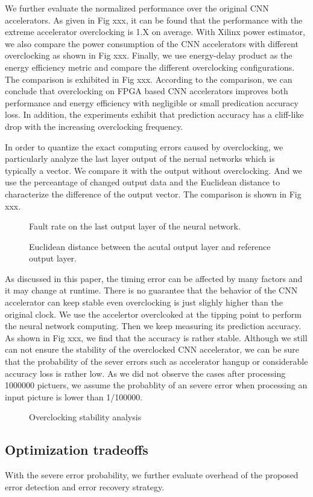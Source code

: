 We further evaluate the normalized performance over the original CNN accelerators.
As given in Fig xxx, it can be found that the performance with the extreme accelerator 
overclocking is 1.X on average. With Xilinx power estimator, we also compare the 
power consumption of the CNN accelerators with different overclocking as shown in Fig xxx.
Finally, we use energy-delay product as the energy efficiency metric and compare the 
different overclocking configurations. The comparison is exhibited in Fig xxx.
According to the comparison, we can conclude that overclocking on FPGA based CNN 
accelerators improves both performance and energy efficiency with negligible or small 
predication accuracy loss. In addition, the experiments exhibit that prediction 
accuracy has a cliff-like drop with the increasing overclocking frequency. 

In order to quantize the exact computing errors caused by overclocking, we 
particularly analyze the last layer output of the nerual networks which 
is typically a vector. We compare it with the output without overclocking.
And we use the perceantage of changed output data and the Euclidean distance to 
characterize the difference of the output vector. The comparison is shown in Fig xxx.

\begin{figure}
    \caption{Fault rate on the last output layer of the neural network.}
\label{fig:fault_rate}
\vspace{-1em}
\end{figure}

\begin{figure}
    \caption{Euclidean distance between the acutal output layer and reference output layer.}
\label{fig:euclidean_distance}
\vspace{-1em}
\end{figure}

As discussed in this paper, the timing error can be affected by many factors and it may change 
at runtime. There is no guarantee that the behavior of the CNN accelerator can keep stable even 
overclocking is just slighly higher than the original clock. We use the accelertor overclcoked at the 
tipping point to perform the neural network computing. Then we keep measuring its 
prediction accuracy. As shown in Fig xxx, we find that the accuracy is rather stable.
Although we still can not ensure the stability of the overclocked CNN accelerator, we can 
be sure that the probability of the sever errors such as accelerator hangup or considerable 
accuracy loss is rather low. As we did not observe the cases after processing 1000000 pictuers, 
we assume the probablity of an severe error when processing an input picture is lower than 1/100000.
\begin{figure}
    \caption{Overclocking stability analysis}
\label{fig:stability}
\vspace{-1em}
\end{figure}


\subsection{Optimization tradeoffs}
With the severe error probability, we further evaluate overhead of 
the proposed error detection and error recovery strategy.

